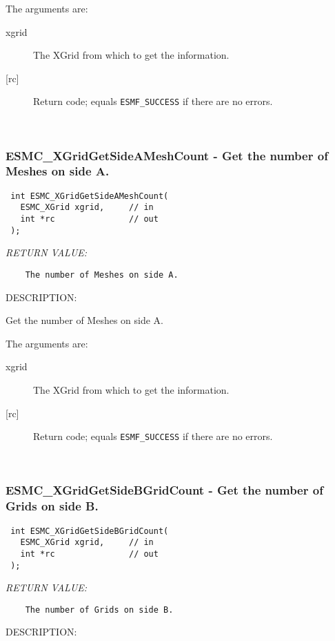     The arguments are:
    \begin{description}
    \item[xgrid]
      The XGrid from which to get the information.
    \item[{[rc]}]
      Return code; equals {\tt ESMF\_SUCCESS} if there are no errors.
    \end{description}
   
 
\mbox{}\hrulefill\ 
 
\subsubsection [ESMC\_XGridGetSideAMeshCount] {ESMC\_XGridGetSideAMeshCount - Get the number of Meshes on side A.}


  
\begin{verbatim} int ESMC_XGridGetSideAMeshCount(
   ESMC_XGrid xgrid,     // in
   int *rc               // out
 );
 \end{verbatim}{\em RETURN VALUE:}
\begin{verbatim}    The number of Meshes on side A. \end{verbatim}
{\sf DESCRIPTION:\\ }


  
    Get the number of Meshes on side A. 
  
    The arguments are:
    \begin{description}
    \item[xgrid]
      The XGrid from which to get the information.
    \item[{[rc]}]
      Return code; equals {\tt ESMF\_SUCCESS} if there are no errors.
    \end{description}
   
 
\mbox{}\hrulefill\ 
 
\subsubsection [ESMC\_XGridGetSideBGridCount] {ESMC\_XGridGetSideBGridCount - Get the number of Grids on side B.}


  
\begin{verbatim} int ESMC_XGridGetSideBGridCount(
   ESMC_XGrid xgrid,     // in
   int *rc               // out
 );
 \end{verbatim}{\em RETURN VALUE:}
\begin{verbatim}    The number of Grids on side B. \end{verbatim}
{\sf DESCRIPTION:\\ }


